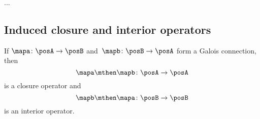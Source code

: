 ...

\subsection{Induced closure and interior operators}
    
\begin{lemma}\label{lem:closure-interior-operators-from-Galois-connection}
If $\mapa \colon \posA \to \posB$ and~$\mapb \colon \posB \to \posA$ form a Galois connection, then 
\begin{equation}\label{eq:closure-from-Galois}
\mapa \mthen \mapb \colon \posA \to \posA
\end{equation}
is a closure operator and
\begin{equation}\label{eq:interior-from-Galois}
\mapb \mthen \mapa \colon \posB \to \posB
\end{equation}
is an interior operator. 
\end{lemma}    
    
    
   





